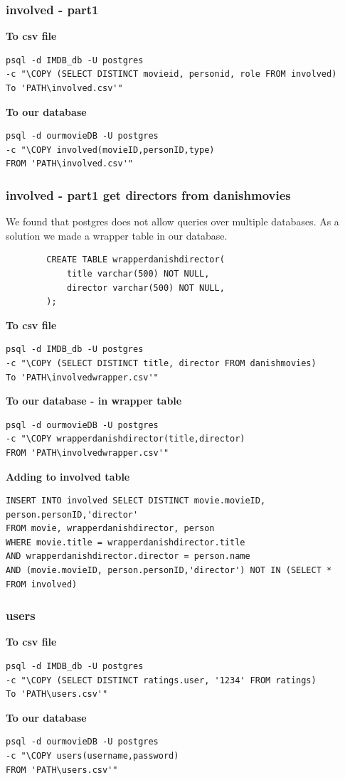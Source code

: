 \documentclass[10pt,a4paper,final]{report}
\begin{document}
\subsubsection*{involved - part1}
\textbf{To csv file}
\begin{lstlisting}
psql -d IMDB_db -U postgres 
-c "\COPY (SELECT DISTINCT movieid, personid, role FROM involved) 
To 'PATH\involved.csv'"
\end{lstlisting}
\textbf{To our database}
\begin{lstlisting}
psql -d ourmovieDB -U postgres 
-c "\COPY involved(movieID,personID,type) 
FROM 'PATH\involved.csv'"
\end{lstlisting}

\subsubsection*{involved - part1 get directors from danishmovies}
We found that postgres does not allow queries over multiple databases. As a solution we made a wrapper table in our database.
\begin{lstlisting}
        CREATE TABLE wrapperdanishdirector(
            title varchar(500) NOT NULL,
            director varchar(500) NOT NULL,
        );
\end{lstlisting}

\textbf{To csv file}
\begin{lstlisting}
psql -d IMDB_db -U postgres 
-c "\COPY (SELECT DISTINCT title, director FROM danishmovies) 
To 'PATH\involvedwrapper.csv'"
\end{lstlisting}
\textbf{To our database - in wrapper table}
\begin{lstlisting}
psql -d ourmovieDB -U postgres 
-c "\COPY wrapperdanishdirector(title,director) 
FROM 'PATH\involvedwrapper.csv'"
\end{lstlisting}

\textbf{Adding to involved table}
\begin{lstlisting}
INSERT INTO involved SELECT DISTINCT movie.movieID, person.personID,'director' 
FROM movie, wrapperdanishdirector, person 
WHERE movie.title = wrapperdanishdirector.title 
AND wrapperdanishdirector.director = person.name 
AND (movie.movieID, person.personID,'director') NOT IN (SELECT * 
FROM involved)
\end{lstlisting}

\subsubsection*{users}
\textbf{To csv file}
\begin{lstlisting}
psql -d IMDB_db -U postgres 
-c "\COPY (SELECT DISTINCT ratings.user, '1234' FROM ratings) 
To 'PATH\users.csv'"
\end{lstlisting}
\textbf{To our database}
\begin{lstlisting}
psql -d ourmovieDB -U postgres 
-c "\COPY users(username,password) 
FROM 'PATH\users.csv'"
\end{lstlisting}
\end{document}
